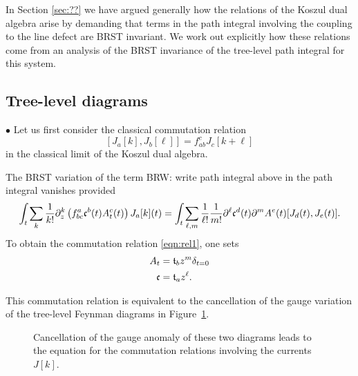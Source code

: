 \documentclass[11pt]{amsart}
\def\brian#1{{\textcolor{blue!65!red}{BRW: {#1}}}}
\begin{document}
In Section \ref{sec:??} we have argued generally how the relations of the Koszul dual algebra arise by demanding that terms in the path integral involving the coupling to the line defect are BRST invariant. 
We work out explicitly how these relations come from an analysis of the BRST invariance of the tree-level path integral for this system.

\subsection*{Tree-level diagrams}

$\bullet$
Let us first consider the classical commutation relation 
\begin{equation}\label{eqn:rel1}
[J_a [k] , J_b [\ell]] = f_{ab}^c J_{c} [k+\ell] 
\end{equation}
in the classical limit of the Koszul dual algebra. 

The BRST variation of the term \brian{write path integral above} in the path integral vanishes provided
\[
\int_t \sum_k \frac1{k!} \partial_z^k \left(f_{bc}^a \mathfrak c^b(t) A^c_t (t) \right) J_a[k] (t) = \int_t \sum_{\ell,m} \frac1{\ell!} \frac1{m!} \partial^\ell \mathfrak c^d (t) \partial^m A^e (t) [J_d (t), J_e(t)]  .
\] 
To obtain the commutation relation \eqref{eqn:rel1}, one sets 
\begin{align*}
A_t & = \mathfrak t_b z^{m} \delta_{t=0} \\
\mathfrak c & = \mathfrak t_a z^\ell .
\end{align*}

This commutation relation is equivalent to the cancellation of the gauge variation of the tree-level Feynman diagrams in Figure~\ref{fig:cancel1}.

\begin{figure}
	\caption{Cancellation of the gauge anomaly of these two diagrams leads to the equation for the commutation relations involving the currents $J[k]$.
	\label{fig:cancel1}}
\end{figure}
\end{document}
